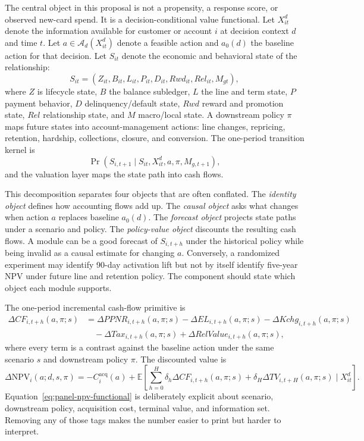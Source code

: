\documentclass[11pt]{article}
\newcommand{\E}{\mathbb{E}}
\newcommand{\NPV}{\mathrm{NPV}}
\newcommand{\1}{\mathbf{1}}
\begin{document}
The central object in this proposal is not a propensity, a response score, or
observed new-card spend. It is a decision-conditional value functional. Let
$X_{it}^{d}$ denote the information available for customer or account $i$ at
decision context $d$ and time $t$. Let $a\in\mathcal{A}_d(X_{it}^{d})$ denote
a feasible action and $a_0(d)$ the baseline action for that decision. Let
$S_{it}$ denote the economic and behavioral state of the relationship:
\[
  S_{it}
  =
  (Z_{it},B_{it},L_{it},P_{it},D_{it},Rwd_{it},Rel_{it},M_{gt}),
\]
where $Z$ is lifecycle state, $B$ the balance subledger, $L$ the line and term
state, $P$ payment behavior, $D$ delinquency/default state, $Rwd$ reward and
promotion state, $Rel$ relationship state, and $M$ macro/local state. A
downstream policy $\pi$ maps future states into account-management actions:
line changes, repricing, retention, hardship, collections, closure, and
conversion. The one-period transition kernel is
\begin{equation}
  \Pr(S_{i,t+1}\mid S_{it},X_{it}^{d},a,\pi,M_{g,t+1}),
  \label{eq:state-kernel-panel}
\end{equation}
and the valuation layer maps the state path into cash flows.

This decomposition separates four objects that are often conflated. The
\emph{identity object} defines how accounting flows add up. The
\emph{causal object} asks what changes when action $a$ replaces baseline
$a_0(d)$. The \emph{forecast object} projects state paths under a scenario and
policy. The \emph{policy-value object} discounts the resulting cash flows. A
module can be a good forecast of $S_{i,t+h}$ under the historical policy while
being invalid as a causal estimate for changing $a$. Conversely, a randomized
experiment may identify 90-day activation lift but not by itself identify
five-year NPV under future line and retention policy. The component should
state which object each module supports.

The one-period incremental cash-flow primitive is
\begin{align}
  \Delta CF_{i,t+h}(a,\pi;s)
  &=
  \Delta PPNR_{i,t+h}(a,\pi;s)
  - \Delta EL_{i,t+h}(a,\pi;s)
  - \Delta Kchg_{i,t+h}(a,\pi;s) \nonumber\\
  &\quad
  - \Delta Tax_{i,t+h}(a,\pi;s)
  + \Delta RelValue_{i,t+h}(a,\pi;s),
  \label{eq:panel-cf-primitive}
\end{align}
where every term is a contrast against the baseline action under the same
scenario $s$ and downstream policy $\pi$. The discounted value is
\begin{equation}
  \Delta \NPV_i(a;d,s,\pi)
  =
  -C_i^{\mathrm{acq}}(a)
  +
  \E\!\left[
    \sum_{h=0}^{H}\delta_h\Delta CF_{i,t+h}(a,\pi;s)
    +\delta_H\Delta TV_{i,t+H}(a,\pi;s)
    \mid X_{it}^{d}
  \right].
  \label{eq:panel-npv-functional}
\end{equation}
Equation~\eqref{eq:panel-npv-functional} is deliberately explicit about
scenario, downstream policy, acquisition cost, terminal value, and information
set. Removing any of those tags makes the number easier to print but harder to
interpret.
\end{document}
